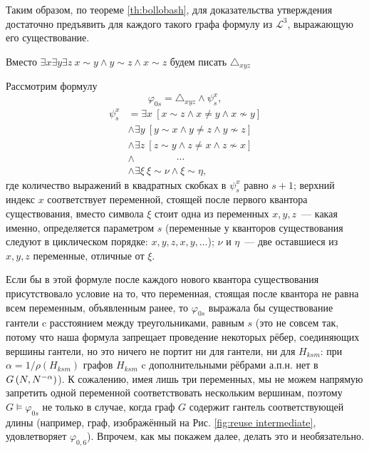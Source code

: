 Таким образом, по теореме \ref{th:bollobash}, для доказательства утверждения достаточно предъявить для каждого такого графа формулу из  $\mathcal{L}^3$, выражающую его существование.




Вместо 
$\exists x \exists y \exists z ~ x \sim y \wedge y \sim z \wedge x \sim z$
будем писать 
$\triangle_{xyz}$

Рассмотрим формулу
\[ \varphi_{0s} = \triangle_{xyz} \wedge \psi_s^{x},\]
\begin{equation}
\label{f:gantel}
\begin{split}
\psi_s^x &= \exists x ~ 
    \left[ x \sim z \wedge x \neq y \wedge x \nsim y  \right] \\
&\wedge \exists y ~
    \left[ y \sim x \wedge y \neq z \wedge y \nsim z \right] \\
&\wedge \exists z ~
    \left[ z \sim y \wedge z \neq x \wedge z \nsim x  \right] \\
&\wedge ~ \qquad \qquad \cdots \\
&\wedge \exists \xi ~ 
    \xi \sim \nu \wedge \xi \sim \eta,
\end{split}
\end{equation}
где количество выражений в квадратных скобках в $\psi_{s}^{x}$ равно $s+1$; верхний индекс $x$ соответствует переменной, стоящей после первого квантора существования, вместо символа $\xi$ стоит одна из переменных $x,y,z$~--- какая именно, определяется параметром $s$ (переменные у кванторов существования следуют в циклическом порядке: $x,y,z,x,y, \ldots$); $\nu$ и $\eta$~--- две оставшиеся из $x,y,z$ переменные, отличные от $\xi$. 

Если бы в этой формуле после каждого нового квантора существования присутствовало условие на то, что переменная, стоящая после квантора не равна всем переменным, объявленным ранее, то $\varphi_{0s}$ выражала бы существование гантели c расстоянием между треугольниками, равным $s$ (это не совсем так, потому что наша формула запрещает проведение некоторых рёбер, соединяющих вершины гантели, но это ничего не портит ни для гантели, ни для $H_{ksm}$:  при $\alpha = 1/\rho(H_{ksm})$ графов $H_{ksm}$ c дополнительными рёбрами а.п.н. нет в $G\left(N,N^{-\alpha}\right)$). 
К сожалению, имея лишь три переменных, мы не можем напрямую запретить одной переменной соответствовать нескольким вершинам, поэтому $G \vDash \varphi_{0s}$ не только в случае, когда граф $G$ содержит гантель соответствующей длины (например, граф, изображённый на Рис. \ref{fig:reuse intermediate}, удовлетворяет $\varphi_{0,6}$).
Впрочем, как мы покажем далее, делать это и необязательно.

